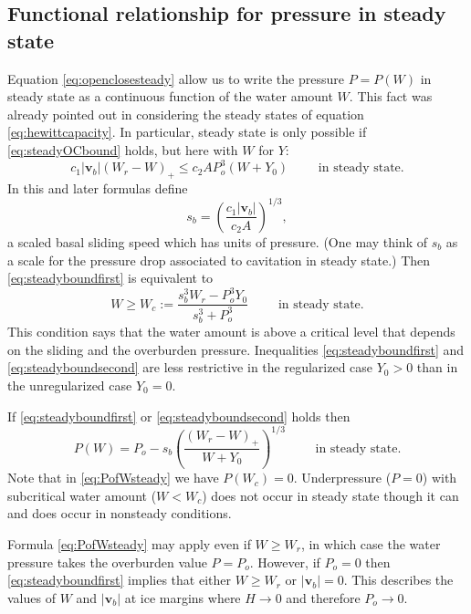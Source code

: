 \documentclass[11pt,final]{amsart}%
\newcommand\bv{\mathbf{v}}
\begin{document}
\subsection*{Functional relationship for pressure in steady state}  Equation \eqref{eq:openclosesteady} allow us to write the pressure $P=P(W)$ in steady state as a continuous function of the water amount $W$.  This fact was already pointed out in considering the steady states of equation \eqref{eq:hewittcapacity}.  In particular, steady state is only possible if \eqref{eq:steadyOCbound} holds, but here with $W$ for $Y$:
\begin{equation}
c_1 |\bv_b| (W_r - W)_+ \le c_2 A P_o^3 (W+Y_0) \qquad \text{ in steady state}. \label{eq:steadyboundfirst}
\end{equation}
In this and later formulas define
\begin{equation}
s_b =  \left(\frac{c_1 |\bv_b|}{c_2 A}\right)^{1/3},  \label{eq:definesb}
\end{equation}
a scaled basal sliding speed which has units of pressure.  (One may think of $s_b$ as a scale for the pressure drop associated to cavitation in steady state.)  Then \eqref{eq:steadyboundfirst} is equivalent to
\begin{equation}
W \ge W_c := \frac{s_b^3 W_r - P_o^3 Y_0}{s_b^3 + P_o^3} \qquad \text{ in steady state}. \label{eq:steadyboundsecond}
\end{equation}
This condition says that the water amount is above a critical level that depends on the sliding and the overburden pressure.  Inequalities \eqref{eq:steadyboundfirst} and \eqref{eq:steadyboundsecond} are less restrictive in the regularized case $Y_0>0$ than in the unregularized case $Y_0=0$.

If \eqref{eq:steadyboundfirst} or \eqref{eq:steadyboundsecond} holds then
\begin{equation}
P(W) = P_o - s_b \left(\frac{(W_r - W)_+}{W+Y_0}\right)^{1/3} \qquad \text{ in steady state}.  \label{eq:PofWsteady}
\end{equation}
Note that in \eqref{eq:PofWsteady} we have $P(W_c)=0$.  Underpressure ($P=0$) with subcritical water amount ($W<W_c$) does not occur in steady state though it can and does occur in nonsteady conditions.  

Formula \eqref{eq:PofWsteady} may apply even if $W\ge W_r$, in which case the water pressure takes the overburden value $P = P_o$.  However, if $P_o=0$ then \eqref{eq:steadyboundfirst} implies that either $W\ge W_r$ or $|\bv_b|=0$.  This describes the values of $W$ and $|\bv_b|$ at ice margins where $H\to 0$ and therefore $P_o\to 0$.
\end{document}
